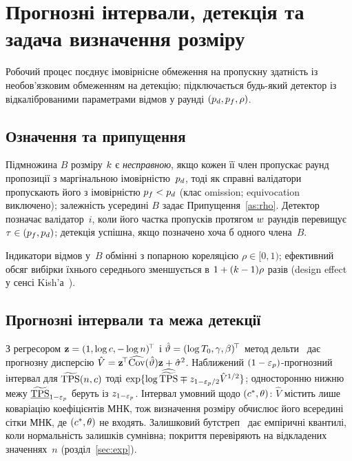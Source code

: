 \section{Прогнозні інтервали, детекція та задача визначення розміру}
\label{sec:sizing}

Робочий процес поєднує імовірнісне обмеження на пропускну здатність із
необов'язковим обмеженням на детекцію; підключається будь-який детектор із
відкаліброваними параметрами відмов у раунді $(p_{d},p_{f},\rho)$.

\subsection{Означення та припущення}

\begin{Def}
\label{def:faults}
Підмножина $B$ розміру $k$ є \emph{несправною}, якщо кожен її член пропускає
раунд пропозиції з маргінальною імовірністю~$p_{d}$, тоді як справні валідатори
пропускають його з імовірністю $p_{f}<p_{d}$ (клас omission; equivocation
виключено); залежність усередині $B$ задає Припущення~\ref{as:rho}. Детектор
позначає валідатор~$i$, коли його частка пропусків
протягом $w$ раундів перевищує $\tau\in(p_{f},p_{d})$; детекція успішна, якщо
позначено хоча б одного члена~$B$.
\end{Def}

\begin{Assumption}
\label{as:rho}
Індикатори відмов у~$B$ обмінні з попарною кореляцією $\rho\in[0,1)$; ефективний
обсяг вибірки їхнього середнього зменшується в $1+(k-1)\rho$ разів (design
effect у сенсі Kish'а~\cite{kish1965}).
\end{Assumption}

\subsection{Прогнозні інтервали та межа детекції}
\label{sec:detection}

З регресором $\mathbf{z}=(1,\log c,-\log n)^{\!\top}$ і
$\hat\vartheta=(\log T_{0},\gamma,\beta)^{\!\top}$ метод
дельти~\cite{seber2003} дає прогнозну дисперсію
$\hat{V}=\mathbf{z}^{\!\top}\widehat{\mathrm{Cov}}(\hat\vartheta)\mathbf{z}+\hat\sigma^{2}$.
Наближений $(1-\varepsilon_{p})$-прогнозний інтервал для $\widetilde{\mathrm{TPS}}(n,c)$ тоді
$\exp\{\log\widehat{\widetilde{\mathrm{TPS}}}\mp z_{1-\varepsilon_{p}/2}\hat{V}^{1/2}\}$;\label{st:pi}
односторонню нижню межу $\underline{\widetilde{\mathrm{TPS}}}_{1-\varepsilon_{p}}$ беруть із $z_{1-\varepsilon_{p}}$.
Інтервал умовний щодо $(c^{\ast},\theta)$: $\hat V$ містить лише коваріацію
коефіцієнтів МНК, тож визначення розміру обчислює його всередині сітки МНК, де
$(c^{\ast},\theta)$ не входять. Залишковий бутстреп~\cite{efron1993} дає емпіричні
квантилі, коли нормальність залишків сумнівна; покриття перевіряють на
відкладених значеннях~$n$ (розділ~\ref{sec:exp}).

